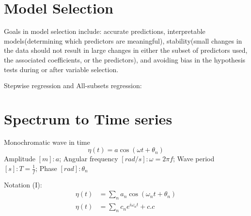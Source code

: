 \documentclass[twocolumn,10pt]{asme2e}
\begin{document}





\section{Model Selection}
Goals in model selection include: accurate predictions, interpretable models(determining which predictors are meaningful), stability(small changes in the data should not result in large changes in either the subset of predictors used, the associated coefficients, or the predictors), and avoiding bias in the hypothesis tests during or after variable selection.

Stepwise regression and All-subsets regression:


\section{Spectrum to Time series}
Monochromatic wave in time 
\[ \eta(t) = a \cos(\omega t + \theta_n)\]
Amplitude $[m]:a $; Angular frequency $[rad/s]: \omega = 2\pi f$; Wave period $[s]: T = \frac{1}{f}$; Phase $[rad]: \theta_n$ 

Notation (I):
\begin{equation}
  \begin{aligned}
	\eta(t) &= \sum_n a_n \cos (\omega_n t +\theta_n) \\
	\eta(t) &= \sum_n c_n e^{i\omega_n t} + c.c
  \end{aligned}
  \label{eqn:Gaussian_wave_notations}
\end{equation}
\end{document}
